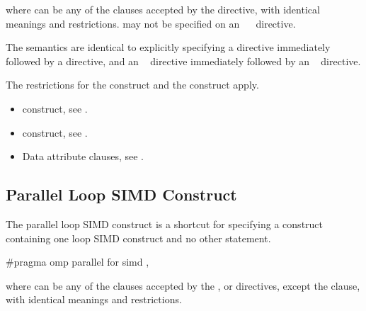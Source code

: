 where  can be any of the clauses accepted by the  directive, with 
identical meanings and restrictions.  may not be specified on an 
~~ directive.

\descr
The semantics are identical to explicitly specifying a  directive immediately 
followed by a  directive, and an ~ directive immediately 
followed by an ~ directive. 

\restrictions
The restrictions for the  construct and the  construct apply.

\crossreferences
\begin{itemize}
\item {} construct, see 
. 

\item {} construct, see 
.

\item Data attribute clauses, see 
.
\end{itemize}
\fortranspecificend










\subsection{Parallel Loop SIMD Construct}
\label{subsec:Parallel Loop SIMD Construct}
\summary
The parallel loop SIMD construct is a shortcut for specifying a  construct 
containing one loop SIMD construct and no other statement.

\begin{samepage}
\syntax
\ccppspecificstart
\begin{boxedcode}
\#pragma omp parallel for simd \plc{[clause[ [},\plc{] clause] ... ] new-line}
\end{boxedcode}

where  can be any of the clauses accepted by the ,  or  
directives, except the  clause, with identical meanings and restrictions.
\ccppspecificend
\end{samepage}

